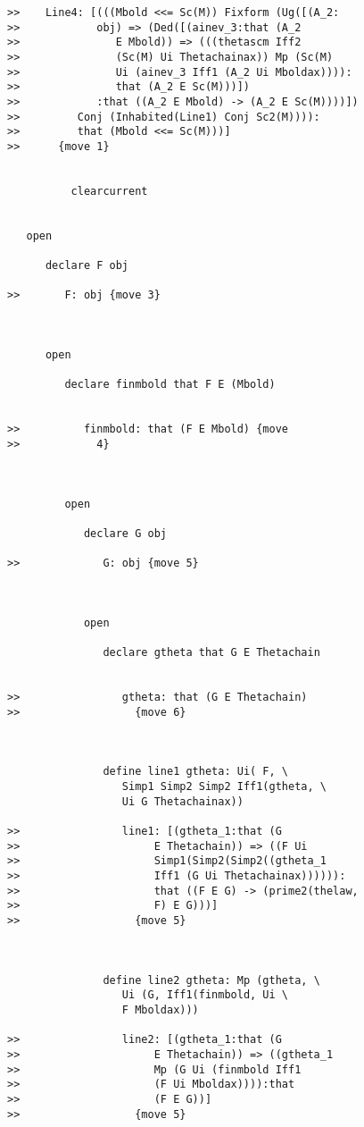 \documentclass[12pt]{article}
\begin{document}
\begin{verbatim}
>>    Line4: [(((Mbold <<= Sc(M)) Fixform (Ug([(A_2:
>>            obj) => (Ded([(ainev_3:that (A_2
>>               E Mbold)) => (((thetascm Iff2
>>               (Sc(M) Ui Thetachainax)) Mp (Sc(M)
>>               Ui (ainev_3 Iff1 (A_2 Ui Mboldax)))):
>>               that (A_2 E Sc(M)))])
>>            :that ((A_2 E Mbold) -> (A_2 E Sc(M))))])
>>         Conj (Inhabited(Line1) Conj Sc2(M)))):
>>         that (Mbold <<= Sc(M)))]
>>      {move 1}


          clearcurrent


   open

      declare F obj

>>       F: obj {move 3}



      open

         declare finmbold that F E (Mbold)


>>          finmbold: that (F E Mbold) {move
>>            4}



         open

            declare G obj

>>             G: obj {move 5}



            open

               declare gtheta that G E Thetachain


>>                gtheta: that (G E Thetachain)
>>                  {move 6}



               define line1 gtheta: Ui( F, \
                  Simp1 Simp2 Simp2 Iff1(gtheta, \
                  Ui G Thetachainax))

>>                line1: [(gtheta_1:that (G
>>                     E Thetachain)) => ((F Ui
>>                     Simp1(Simp2(Simp2((gtheta_1
>>                     Iff1 (G Ui Thetachainax)))))):
>>                     that ((F E G) -> (prime2(thelaw,
>>                     F) E G)))]
>>                  {move 5}



               define line2 gtheta: Mp (gtheta, \
                  Ui (G, Iff1(finmbold, Ui \
                  F Mboldax)))

>>                line2: [(gtheta_1:that (G
>>                     E Thetachain)) => ((gtheta_1
>>                     Mp (G Ui (finmbold Iff1
>>                     (F Ui Mboldax)))):that
>>                     (F E G))]
>>                  {move 5}




\end{verbatim}
\end{document}
